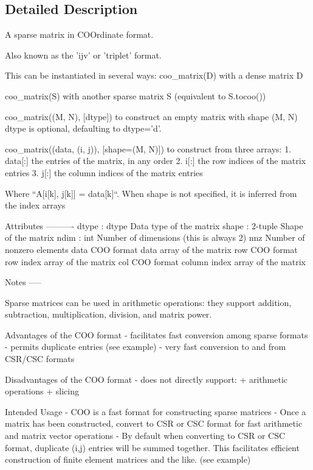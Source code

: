 \subsection{Detailed Description}
\begin{DoxyVerb}A sparse matrix in COOrdinate format.

Also known as the 'ijv' or 'triplet' format.

This can be instantiated in several ways:
    coo_matrix(D)
        with a dense matrix D

    coo_matrix(S)
        with another sparse matrix S (equivalent to S.tocoo())

    coo_matrix((M, N), [dtype])
        to construct an empty matrix with shape (M, N)
        dtype is optional, defaulting to dtype='d'.

    coo_matrix((data, (i, j)), [shape=(M, N)])
        to construct from three arrays:
            1. data[:]   the entries of the matrix, in any order
            2. i[:]      the row indices of the matrix entries
            3. j[:]      the column indices of the matrix entries

        Where ``A[i[k], j[k]] = data[k]``.  When shape is not
        specified, it is inferred from the index arrays

Attributes
----------
dtype : dtype
    Data type of the matrix
shape : 2-tuple
    Shape of the matrix
ndim : int
    Number of dimensions (this is always 2)
nnz
    Number of nonzero elements
data
    COO format data array of the matrix
row
    COO format row index array of the matrix
col
    COO format column index array of the matrix

Notes
-----

Sparse matrices can be used in arithmetic operations: they support
addition, subtraction, multiplication, division, and matrix power.

Advantages of the COO format
    - facilitates fast conversion among sparse formats
    - permits duplicate entries (see example)
    - very fast conversion to and from CSR/CSC formats

Disadvantages of the COO format
    - does not directly support:
        + arithmetic operations
        + slicing

Intended Usage
    - COO is a fast format for constructing sparse matrices
    - Once a matrix has been constructed, convert to CSR or
      CSC format for fast arithmetic and matrix vector operations
    - By default when converting to CSR or CSC format, duplicate (i,j)
      entries will be summed together.  This facilitates efficient
      construction of finite element matrices and the like. (see example)


\end{DoxyVerb}
